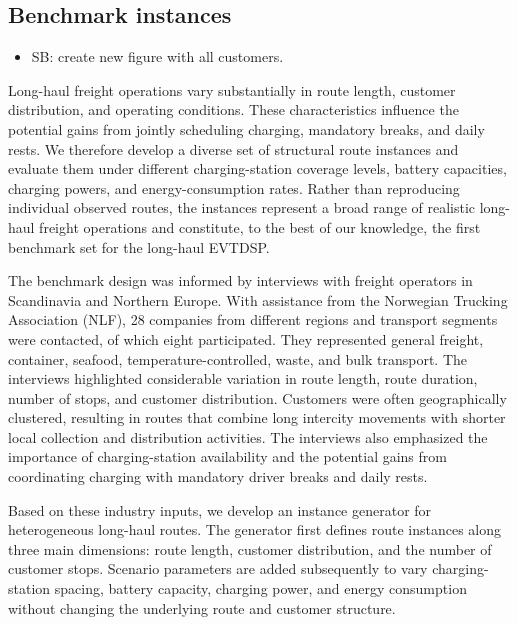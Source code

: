 \documentclass[3p,11pt,authoryear]{elsarticle}  %
\begin{document}
\subsection{Benchmark instances}

{
\color{red}
\begin{itemize}
    \item SB: create new figure with all customers.
\end{itemize}
}
Long-haul freight operations vary substantially in route length, customer distribution, and operating conditions. These characteristics influence the potential gains from jointly scheduling charging, mandatory breaks, and daily rests. We therefore develop a diverse set of structural route instances and evaluate them under different charging-station coverage levels, battery capacities, charging powers, and energy-consumption rates. Rather than reproducing individual observed routes, the instances represent a broad range of realistic long-haul freight operations and constitute, to the best of our knowledge, the first benchmark set for the long-haul EVTDSP.

The benchmark design was informed by interviews with freight operators in Scandinavia and Northern Europe. With assistance from the Norwegian Trucking Association (NLF), 28 companies from different regions and transport segments were contacted, of which eight participated. They represented general freight, container, seafood, temperature-controlled, waste, and bulk transport. The interviews highlighted considerable variation in route length, route duration, number of stops, and customer distribution. Customers were often geographically clustered, resulting in routes that combine long intercity movements with shorter local collection and distribution activities. The interviews also emphasized the importance of charging-station availability and the potential gains from coordinating charging with mandatory driver breaks and daily rests.


Based on these industry inputs, we develop an instance generator for heterogeneous long-haul routes. The generator first defines route instances along three main dimensions: route length, customer distribution, and the number of customer stops. %
Scenario parameters are added subsequently to vary charging-station spacing, battery capacity, charging power, and energy consumption without changing the underlying route and customer structure.
\end{document}

